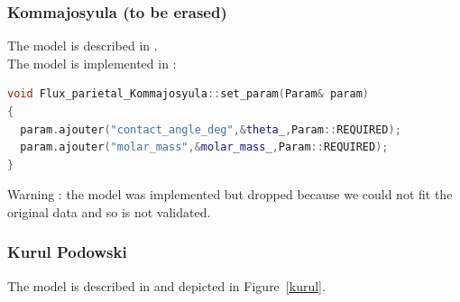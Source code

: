 \subsubsection{Kommajosyula (to be erased)}
The model is described in \cite{Ravik2020}.\\
The model is implemented in :
\begin{lstlisting}[language=c++]
void Flux_parietal_Kommajosyula::set_param(Param& param)
{
  param.ajouter("contact_angle_deg",&theta_,Param::REQUIRED);
  param.ajouter("molar_mass",&molar_mass_,Param::REQUIRED);
}
\end{lstlisting}
{\color{red} Warning} : the model was implemented but dropped because we could not fit the original data and so is not validated.

\subsubsection{Kurul Podowski}
The model is described in \cite{kurul1991modeling} and depicted in Figure~\ref{kurul}.

